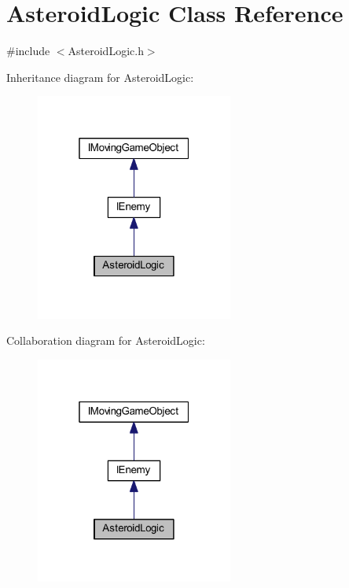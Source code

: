 \hypertarget{class_asteroid_logic}{}\section{Asteroid\+Logic Class Reference}
\label{class_asteroid_logic}


{\ttfamily \#include $<$Asteroid\+Logic.\+h$>$}



Inheritance diagram for Asteroid\+Logic\+:\nopagebreak
\begin{figure}[H]
\begin{center}
\leavevmode
\includegraphics[width=184pt]{class_asteroid_logic__inherit__graph}
\end{center}
\end{figure}


Collaboration diagram for Asteroid\+Logic\+:\nopagebreak
\begin{figure}[H]
\begin{center}
\leavevmode
\includegraphics[width=184pt]{class_asteroid_logic__coll__graph}
\end{center}
\end{figure}
